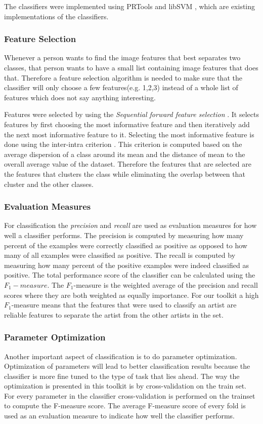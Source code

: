 The classifiers were implemented using PRTools \cite{Duin00prtoolsversion} and libSVM \cite{chang2001libsvm}, which are existing implementations of the classifiers.

\subsubsection{Feature Selection}
Whenever a person wants to find the image features that best separates two classes, that person wants to have a small list containing image features that does that.
Therefore a feature selection algorithm is needed to make sure that the classifier will only choose a few features(e.g. 1,2,3) instead of a whole list of features which does not say anything interesting.

Features were selected by using the \textit{Sequential forward feature selection} \cite{pudil1994floating}.
It selects features by first choosing the most informative feature and then iteratively add the next most informative feature to it.
Selecting the most informative feature is done using the inter-intra criterion \cite{pekalska2005pairwise}.
This criterion is computed based on the average dispersion of a class around its mean and the distance of mean to the overall average value of the dataset.
Therefore the features that are selected are the features that clusters the class while eliminating the overlap between that cluster and the other classes.

\subsubsection{Evaluation Measures}
For classification the \textit{precision} and \textit{recall} are used as evaluation measures for how well a classifier performs.
The precision is computed by measuring how many percent of the examples were correctly classified as positive as opposed to how many of all examples were classified as positive.
The recall is computed by measuring how many percent of the positive examples were indeed classified as positive.
The total performance score of the classifier can be calculated using the $F_1-measure$.
The $F_1$-measure is the weighted average of the precision and recall scores where they are both weighted as equally importance.
For our toolkit a high $F_1$-measure means that the features that were used to classify an artist are reliable features to separate the artist from the other artists in the set.

\subsubsection{Parameter Optimization}
Another important aspect of classification is to do parameter optimization. 
Optimization of parameters will lead to better classification results because the classifier is more fine tuned to the type of task that lies ahead. 
The way the optimization is presented in this toolkit is by cross-validation on the train set.
For every parameter in the classifier cross-validation is performed on the trainset to compute the F-measure score.
The average F-measure score of every fold is used as an evaluation measure to indicate how well the classifier performs.

